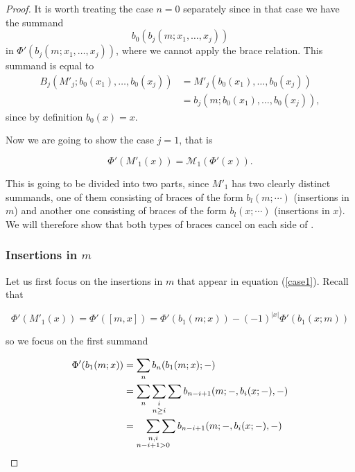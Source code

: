 \documentclass[Thesis.tex]{subfiles}
\begin{document}
\begin{proof}
It is worth treating the case $n=0$ separately since in that case we have the summand \[b_0(b_j(m;x_1,\dots, x_j))\] 
in $\Phi'(b_j(m;x_1,\dots, x_j))$, where we cannot apply the brace relation. This summand is equal to 
\begin{align*}
B_j(M'_j;b_0(x_1),\dots, b_0(x_j))&=M'_j(b_0(x_1),\dots, b_0(x_j))\\
&=b_j(m;b_0(x_1),\dots, b_0(x_j)), 
\end{align*}
since by definition $b_0(x)=x$.%

Now we are going to show the case $j=1$, that is

\begin{equation}\label{case1}
\Phi'(M'_1(x))=\mathcal{M}_1(\Phi'(x)).
\end{equation} 

This is going to be divided into two parts, since $M'_1$ has two clearly distinct summands, one of them consisting of braces of the form $b_l(m;\cdots)$ (insertions in $m$) and another one consisting of braces of the form $b_l(x;\cdots)$ (insertions in $x$). We will therefore show that both types of braces cancel on each side of .

\subsubsection*{Insertions in $m$}

Let us first focus on the insertions in $m$ that appear in equation (\ref{case1}). Recall that 

\begin{equation}\label{phim}
\Phi'(M'_1(x))=\Phi'([m,x])=\Phi'(b_1(m;x))-(-1)^{|x|}\Phi'(b_1(x;m))
\end{equation}

so we focus on the first summand

\begin{align*}
\Phi'(b_1(m;x))&=\sum_n b_n(b_1(m;x);-)\\
&=\sum_n \underset{n\geq i}{\sum_i} \sum b_{n-i+1}(m;-, b_i(x;-),-)\\
&=\smashoperator[r]{\sum_{\substack{n,i\\n-i+1> 0}}}\sum b_{n-i+1}(m;-, b_i(x;-),-)
\end{align*}


\end{proof}
\end{document}
